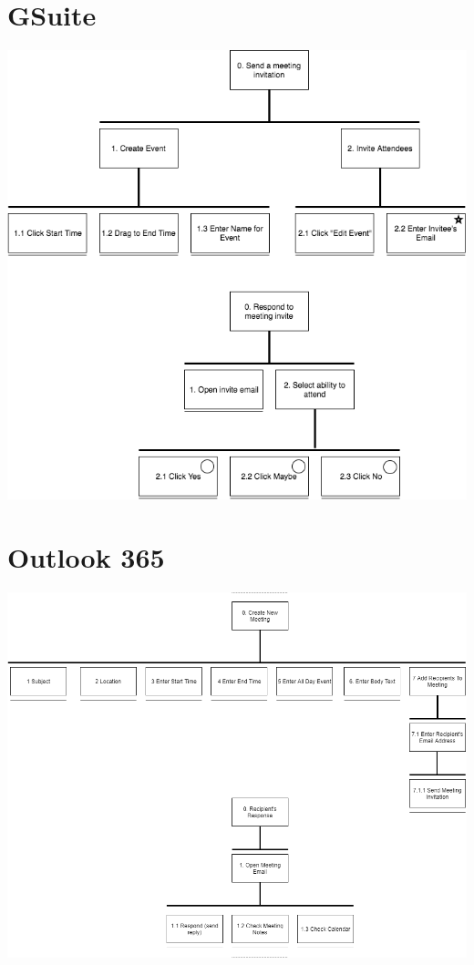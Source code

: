 \documentclass[11pt]{article}
\begin{document}
\section{GSuite}
\label{sec:orgbb8c763}

\begin{center}
\includegraphics[width=.9\linewidth]{google/Google HTA.png}
\end{center}

\section{Outlook 365}
\label{sec:orgfde97b4}

\begin{center}
\includegraphics[width=.9\linewidth]{Outlook/Create_Meeting.png}
\end{center}
\end{document}

